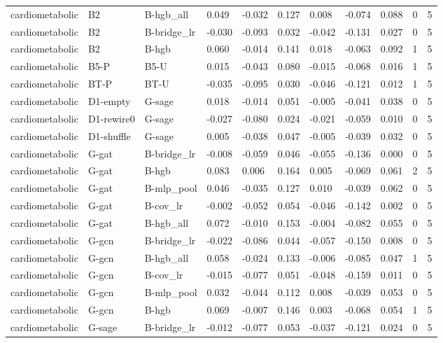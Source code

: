 \begin{table}[t]
\begin{tabular}{lllllllllll}
cardiometabolic & B2 & B-hgb\_all & 0.049 & -0.032 & 0.127 & 0.008 & -0.074 & 0.088 & 0 & 5 \\
cardiometabolic & B2 & B-bridge\_lr & -0.030 & -0.093 & 0.032 & -0.042 & -0.131 & 0.027 & 0 & 5 \\
cardiometabolic & B2 & B-hgb & 0.060 & -0.014 & 0.141 & 0.018 & -0.063 & 0.092 & 1 & 5 \\
cardiometabolic & B5-P & B5-U & 0.015 & -0.043 & 0.080 & -0.015 & -0.068 & 0.016 & 1 & 5 \\
cardiometabolic & BT-P & BT-U & -0.035 & -0.095 & 0.030 & -0.046 & -0.121 & 0.012 & 1 & 5 \\
cardiometabolic & D1-empty & G-sage & 0.018 & -0.014 & 0.051 & -0.005 & -0.041 & 0.038 & 0 & 5 \\
cardiometabolic & D1-rewire0 & G-sage & -0.027 & -0.080 & 0.024 & -0.021 & -0.059 & 0.010 & 0 & 5 \\
cardiometabolic & D1-shuffle & G-sage & 0.005 & -0.038 & 0.047 & -0.005 & -0.039 & 0.032 & 0 & 5 \\
cardiometabolic & G-gat & B-bridge\_lr & -0.008 & -0.059 & 0.046 & -0.055 & -0.136 & 0.000 & 0 & 5 \\
cardiometabolic & G-gat & B-hgb & 0.083 & 0.006 & 0.164 & 0.005 & -0.069 & 0.061 & 2 & 5 \\
cardiometabolic & G-gat & B-mlp\_pool & 0.046 & -0.035 & 0.127 & 0.010 & -0.039 & 0.062 & 0 & 5 \\
cardiometabolic & G-gat & B-cov\_lr & -0.002 & -0.052 & 0.054 & -0.046 & -0.142 & 0.002 & 0 & 5 \\
cardiometabolic & G-gat & B-hgb\_all & 0.072 & -0.010 & 0.153 & -0.004 & -0.082 & 0.055 & 0 & 5 \\
cardiometabolic & G-gcn & B-bridge\_lr & -0.022 & -0.086 & 0.044 & -0.057 & -0.150 & 0.008 & 0 & 5 \\
cardiometabolic & G-gcn & B-hgb\_all & 0.058 & -0.024 & 0.133 & -0.006 & -0.085 & 0.047 & 1 & 5 \\
cardiometabolic & G-gcn & B-cov\_lr & -0.015 & -0.077 & 0.051 & -0.048 & -0.159 & 0.011 & 0 & 5 \\
cardiometabolic & G-gcn & B-mlp\_pool & 0.032 & -0.044 & 0.112 & 0.008 & -0.039 & 0.053 & 0 & 5 \\
cardiometabolic & G-gcn & B-hgb & 0.069 & -0.007 & 0.146 & 0.003 & -0.068 & 0.054 & 1 & 5 \\
cardiometabolic & G-sage & B-bridge\_lr & -0.012 & -0.077 & 0.053 & -0.037 & -0.121 & 0.024 & 0 & 5 \\

\end{tabular}
\end{table}
